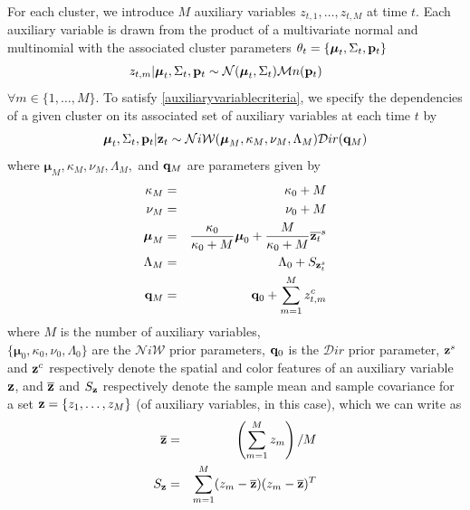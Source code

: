 \documentclass[twocolumn, final]{svjour3}
\begin{document}
For each cluster, we introduce $M$ auxiliary variables $z_{t, 1}, \ldots, z_{t, M}$ at time $t$. Each auxiliary variable is drawn from the product of a multivariate normal and multinomial with the associated cluster parameters $\theta_{t} = \{ \boldsymbol{\mu}_{t}, \Sigma_{t}, \bold{p}_{t} \}$
\begin{equation}
\label{transker1}
z_{t, m} | \boldsymbol{\mu}_{t}, \Sigma_{t}, \bold{p}_{t}  \sim  \mathcal{N}(\boldsymbol{\mu}_{t}, \Sigma_{t}) \mathcal{M}n(\bold{p}_{t})   \hspace{15pt}   
\end{equation}
$\forall m \in \{ 1, \ldots, M \}$. To satisfy \eqref{auxiliaryvariablecriteria}, we specify the dependencies of a given cluster on its associated set of auxiliary variables at each time $t$ by
\begin{equation}
\label{transker2}
\boldsymbol{\mu}_{t}, \Sigma_{t}, \bold{p}_{t} | \bold{z}_t  \sim  \mathcal{N}i\mathcal{W}(\boldsymbol{\mu}_{M}, \kappa_{M}, \nu_{M}, \Lambda_{M})  \mathcal{D}ir(\bold{q}_{M})
\end{equation}
where $\boldsymbol{\mu}_{M}, \kappa_{M}, \nu_{M}, \Lambda_{M},$ and $\bold{q}_{M}$ are parameters given by
\begin{eqnarray}
\kappa_{M} &=& \kappa_{0} + M \\
\nu_{M} &=& \nu_{0} + M \\
\boldsymbol{\mu}_{M} &=& \frac{\kappa_{0}}{\kappa_{0}+M} \boldsymbol{\mu}_{0}  +  \frac{M}{\kappa_{0}+M} \overline{\bold{z}_t}^{s}\\
\Lambda_{M} &=& \Lambda_{0} + S_{\bold{z}_{t}^{s}}\\
\bold{q}_{M} &=& \bold{q}_{0} + \sum_{m=1}^{M} z_{t,m}^{c}
\end{eqnarray}
where $M$ is the number of auxiliary variables, \\
$\{ \boldsymbol{\mu}_{0}, \kappa_{0}, \nu_{0}, \Lambda_{0} \}$ are the $\mathcal{N}i\mathcal{W}$ prior parameters, $\bold{q}_{0}$ is the $\mathcal{D}ir$ prior parameter, $\bold{z}^{s}$ and $\bold{z}^{c}$ respectively denote the spatial and color features of an auxiliary variable $\bold{z}$, and $\overline{\bold{z}}$ and $S_{\bold{z}}$ respectively denote the sample mean and sample covariance for a set $\bold{z} = \{ z_{1}, \ldots, z_{M} \}$ (of auxiliary variables, in this case), which we can write as
\begin{eqnarray}
\label{samplemean}
\overline{\bold{z}}  &=&  \left( \sum_{m=1}^{M} z_{m} \right) / M\\
\label{samplecov}
S_{\bold{z}}  &=&  \sum_{m=1}^{M} (z_{m} - \overline{\bold{z}}) (z_{m} - \overline{\bold{z}})^{T}
\end{eqnarray}
\end{document}
